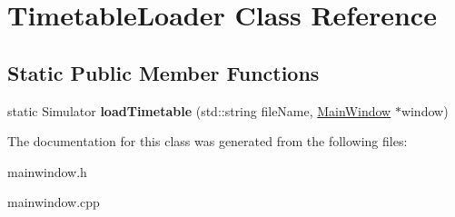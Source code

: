 \hypertarget{class_timetable_loader}{}\section{Timetable\+Loader Class Reference}
\label{class_timetable_loader}
\subsection*{Static Public Member Functions}
\begin{DoxyCompactItemize}
\item 
static Simulator {\bfseries load\+Timetable} (std\+::string file\+Name, \hyperlink{class_main_window}{Main\+Window} $\ast$window)\hypertarget{class_timetable_loader_a0767ca0adc613d13bcd031336c917950}{}\label{class_timetable_loader_a0767ca0adc613d13bcd031336c917950}

\end{DoxyCompactItemize}


The documentation for this class was generated from the following files\+:\begin{DoxyCompactItemize}
\item 
mainwindow.\+h\item 
mainwindow.\+cpp\end{DoxyCompactItemize}

